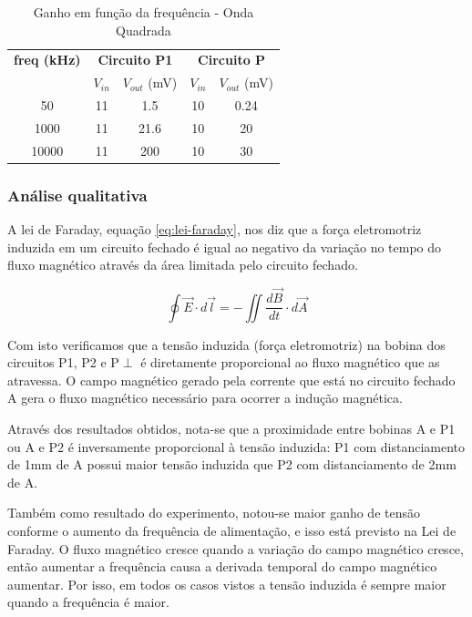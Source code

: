 \documentclass[12pt]{article}
\begin{document}
\begin{table}[htbp]
  \centering
  \begin{tabular}{c|cc|cc}
    \toprule
    \textbf{freq (kHz)} & \multicolumn{2}{c|}{\textbf{Circuito P1}} &
    \multicolumn{2}{c}{\textbf{Circuito P}} \\
    & $V_{in}$ & $V_{out}$ (mV) & $V_{in}$ & $V_{out}$ (mV) \\
    \midrule
    50      & 11   & 1.5   & 10 & 0.24 \\
    1000    & 11   & 21.6  & 10 & 20   \\
    10000   & 11   & 200   & 10 & 30   \\
    \bottomrule
  \end{tabular}
  \caption{Ganho em função da frequência - Onda Quadrada}
  \label{tab:ganho-onda-quadrada}
\end{table}

\subsubsection{Análise qualitativa}
A lei de Faraday, equação \ref{eq:lei-faraday}, nos diz que a força
eletromotriz induzida em um circuito
fechado é igual ao negativo da variação no tempo do fluxo magnético através da
área limitada pelo circuito fechado.

\begin{equation}
  \label{eq:lei-faraday}
  \oint \vec{E} \cdot d\vec{l} = -\iint \frac{d\vec{B}}{dt}   \cdot d\vec{A}
\end{equation}

Com isto verificamos que a tensão induzida (força eletromotriz) na
bobina dos circuitos P1, P2 e P$\perp$ é diretamente proporcional ao  fluxo
magnético que as atravessa. O campo magnético gerado pela corrente
que está no circuito fechado A gera o fluxo magnético necessário para
ocorrer a indução magnética.

Através dos resultados obtidos, nota-se que a proximidade entre
bobinas A e P1 ou A e P2 é inversamente proporcional à tensão
induzida: P1 com distanciamento de 1mm de A possui maior tensão
induzida que P2 com distanciamento de 2mm de A.

Também como resultado do experimento, notou-se maior ganho de tensão
conforme o aumento da frequência de alimentação, e isso está previsto
na Lei de Faraday. O fluxo magnético cresce quando a variação do
campo magnético cresce, então aumentar a frequência causa a derivada
temporal do campo magnético aumentar. Por isso, em todos os casos
vistos a tensão induzida é sempre maior quando a frequência é maior.
\end{document}
